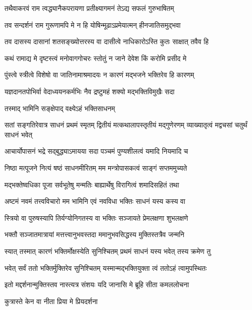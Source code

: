\twolineshloka
{तथैवाकरवं राम त्वद्ध्यानैकपरायणा}
{प्रतीक्ष्यागमनं तेऽद्य सफलं गुरुभाषितम्} %

\twolineshloka
{तव सन्दर्शनं राम गुरूणामपि मे न हि}
{योषिन्मूढाऽप्रमेयात्मन् हीनजातिसमुद्भवा} %

\twolineshloka
{तव दासस्य दासानां शतसङ्ख्योत्तरस्य वा}
{दासीत्वे नाधिकारोऽस्ति कुतः साक्षात् तवैव हि} %

\twolineshloka
{कथं रामाद्य मे दृष्टस्त्वं मनोवागगोचरः}
{स्तोतुं न जाने देवेश किं करोमि प्रसीद मे} %


\twolineshloka
{पुंस्त्वे स्त्रीत्वे विशेषो वा जातिनामाश्रमादयः}
{न कारणं मद्भजने भक्तिरेव हि कारणम्} %

\twolineshloka
{यज्ञदानतपोभिर्वा वेदाध्ययनकर्मभिः}
{नैव द्रष्टुमहं शक्यो मद्भक्तिविमुखैः सदा} %

\onelineshloka
{तस्माद् भामिनि सङ्क्षेपाद् वक्ष्येऽहं भक्तिसाधनम्} %


\threelineshloka
{सतां सङ्गतिरेवात्र साधनं प्रथमं स्मृतम्}
{द्वितीयं मत्कथालापस्तृतीयं मद्गुणेरणम्}
{व्याख्यातृत्वं मद्वचसां चतुर्थं साधनं भवेत्} %

\twolineshloka
{आचार्योपासनं भद्रे सद्बुद्ध्याऽमायया सदा}
{पञ्चमं पुण्यशीलत्वं यमादि नियमादि च} %

\twolineshloka
{निष्ठा मत्पूजने नित्यं षष्ठं साधनमीरितम्}
{मम मन्त्रोपासकत्वं साङ्गं सप्तममुच्यते} %

\twolineshloka
{मद्भक्तेष्वधिका पूजा सर्वभूतेषु मन्मतिः}
{बाह्यार्थेषु विरागित्वं शमादिसहितं तथा} %

\twolineshloka
{अष्टमं नवमं तत्त्वविचारो मम भामिनि}
{एवं नवविधा भक्तिः साधनं यस्य कस्य वा} %

\twolineshloka
{स्त्रियो वा पुरुषस्यापि तिर्यग्योनिगतस्य वा}
{भक्तिः सञ्जायते प्रेमलक्षणा शुभलक्षणे} %

\twolineshloka
{भक्तौ सञ्जातमात्रायां मत्तत्त्वानुभवस्तदा}
{ममानुभवसिद्धस्य मुक्तिस्तत्रैव जन्मनि} %

\twolineshloka
{स्यात् तस्मात् कारणं भक्तिर्मोक्षस्येति सुनिश्चितम्}
{प्रथमं साधनं यस्य भवेत् तस्य क्रमेण तु} %

\twolineshloka
{भवेत् सर्वं ततो भक्तिर्मुक्तिरेव सुनिश्चितम्}
{यस्मान्मद्भक्तियुक्ता त्वं ततोऽहं त्वामुपस्थितः} %

\twolineshloka
{इतो मद्दर्शनान्मुक्तिस्तव नास्त्यत्र संशयः}
{यदि जानासि मे ब्रूहि सीता कमललोचना} %

\onelineshloka
{कुत्रास्ते केन वा नीता प्रिया मे प्रियदर्शना} %


